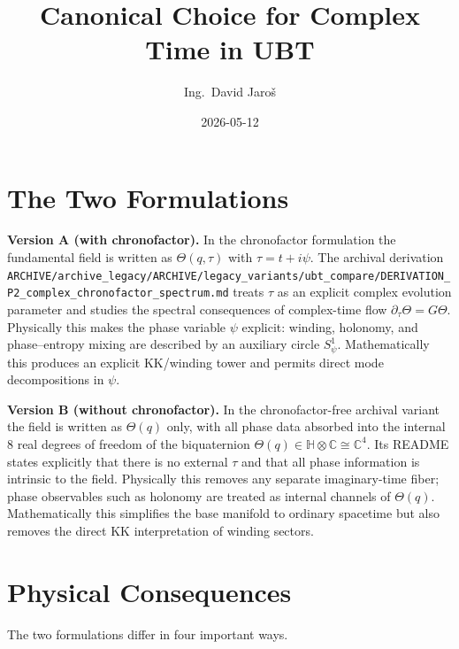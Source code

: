 \documentclass[12pt,a4paper]{article}
\title{Canonical Choice for Complex Time in UBT}
\author{Ing.\ David Jaro\v{s}}
\date{2026-05-12}
\begin{document}
\maketitle

\section{The Two Formulations}

\textbf{Version A (with chronofactor).}  In the chronofactor formulation the
fundamental field is written as $\Theta(q,\tau)$ with
\(
\tau = t + i\psi
\).
The archival derivation
\texttt{ARCHIVE/archive\_legacy/ARCHIVE/legacy\_variants/ubt\_compare/DERIVATION\_P2\_complex\_chronofactor\_spectrum.md}
treats $\tau$ as an explicit complex evolution parameter and studies the
spectral consequences of complex-time flow
\(
\partial_\tau\Theta = G\Theta
\).
Physically this makes the phase variable $\psi$ explicit: winding, holonomy,
and phase--entropy mixing are described by an auxiliary circle $S^1_\psi$.
Mathematically this produces an explicit KK/winding tower and permits direct
mode decompositions in \(\psi\).

\medskip

\textbf{Version B (without chronofactor).}  In the chronofactor-free archival
variant the field is written as $\Theta(q)$ only, with all phase data absorbed
into the internal $8$ real degrees of freedom of the biquaternion
\(
\Theta(q)\in\mathbb{H}\otimes\mathbb{C}\cong\mathbb{C}^4
\).
Its README states explicitly that there is no external $\tau$ and that all
phase information is intrinsic to the field.  Physically this removes any
separate imaginary-time fiber; phase observables such as holonomy are treated as
internal channels of $\Theta(q)$.  Mathematically this simplifies the base
manifold to ordinary spacetime but also removes the direct KK interpretation of
winding sectors.

\section{Physical Consequences}

The two formulations differ in four important ways.
\end{document}
